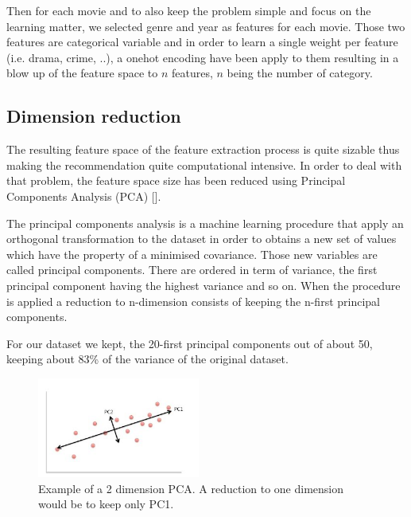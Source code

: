 \documentclass[letterpaper]{article}
\begin{document}
Then for each movie and to also keep the problem simple and focus on the learning matter, we selected genre and year as features for each movie. Those two features are categorical variable and in order to learn a single weight per feature (i.e. drama, crime, ..), a onehot encoding have been apply to them resulting in a blow up of the feature space to $n$ features, $n$ being the number of category.

\begin{table}[h]
\vskip 0.25cm
\caption{Movies feature space}
\end{table}


\subsection{Dimension reduction}

The resulting feature space of the feature extraction process is quite sizable thus making the recommendation quite computational intensive.
In order to deal with that problem, the feature space size has been reduced using Principal Components Analysis (PCA) [\cite{principalcompanalysis}].

The principal components analysis is a machine learning procedure that apply an  orthogonal transformation to the dataset in order to obtains a new set of values which have the property of a minimised covariance. Those new variables are called principal components. There are ordered in term of variance, the first principal component having the highest variance and so on. When the procedure is applied a reduction to n-dimension consists of keeping the n-first principal components.

For our dataset we kept, the 20-first principal components out of about 50, keeping about 83\% of the variance of the original dataset.

\begin{figure}[H]
\begin{center}
\includegraphics[width=2.1in]{img/pca.png}
\caption{Example of a 2 dimension PCA. A reduction to one dimension would be to keep only PC1.}
\label{pca}
\end{center}
\end{figure}
\end{document}
